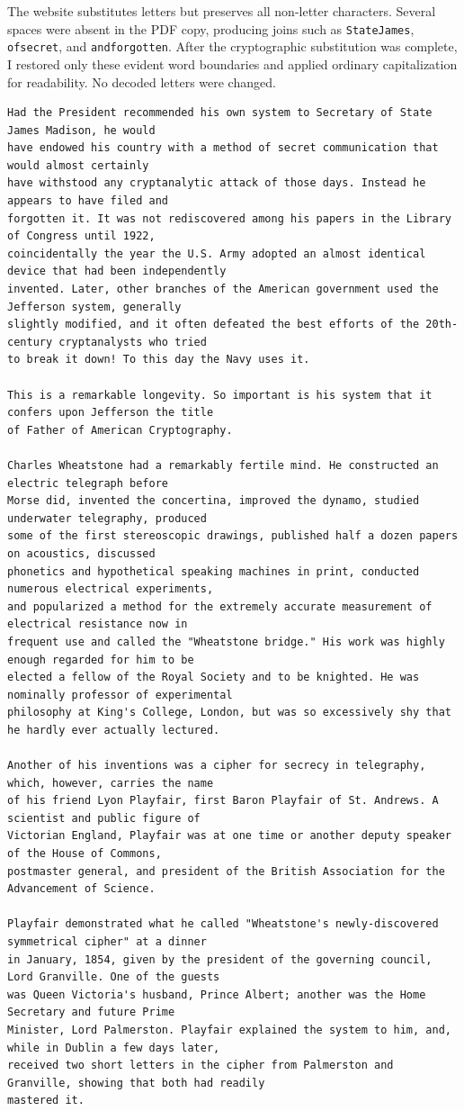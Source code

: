 \documentclass[12pt,a4paper]{article}
\begin{document}
The website substitutes letters but preserves all non-letter characters. Several spaces were absent in the PDF copy, producing joins such as \texttt{StateJames}, \texttt{ofsecret}, and \texttt{andforgotten}. After the cryptographic substitution was complete, I restored only these evident word boundaries and applied ordinary capitalization for readability. No decoded letters were changed.
\begin{lstlisting}[style=plaintext,caption={Recovered plaintext with restored word spacing}]
Had the President recommended his own system to Secretary of State James Madison, he would
have endowed his country with a method of secret communication that would almost certainly
have withstood any cryptanalytic attack of those days. Instead he appears to have filed and
forgotten it. It was not rediscovered among his papers in the Library of Congress until 1922,
coincidentally the year the U.S. Army adopted an almost identical device that had been independently
invented. Later, other branches of the American government used the Jefferson system, generally
slightly modified, and it often defeated the best efforts of the 20th-century cryptanalysts who tried
to break it down! To this day the Navy uses it.

This is a remarkable longevity. So important is his system that it confers upon Jefferson the title
of Father of American Cryptography.

Charles Wheatstone had a remarkably fertile mind. He constructed an electric telegraph before
Morse did, invented the concertina, improved the dynamo, studied underwater telegraphy, produced
some of the first stereoscopic drawings, published half a dozen papers on acoustics, discussed
phonetics and hypothetical speaking machines in print, conducted numerous electrical experiments,
and popularized a method for the extremely accurate measurement of electrical resistance now in
frequent use and called the "Wheatstone bridge." His work was highly enough regarded for him to be
elected a fellow of the Royal Society and to be knighted. He was nominally professor of experimental
philosophy at King's College, London, but was so excessively shy that he hardly ever actually lectured.

Another of his inventions was a cipher for secrecy in telegraphy, which, however, carries the name
of his friend Lyon Playfair, first Baron Playfair of St. Andrews. A scientist and public figure of
Victorian England, Playfair was at one time or another deputy speaker of the House of Commons,
postmaster general, and president of the British Association for the Advancement of Science.

Playfair demonstrated what he called "Wheatstone's newly-discovered symmetrical cipher" at a dinner
in January, 1854, given by the president of the governing council, Lord Granville. One of the guests
was Queen Victoria's husband, Prince Albert; another was the Home Secretary and future Prime
Minister, Lord Palmerston. Playfair explained the system to him, and, while in Dublin a few days later,
received two short letters in the cipher from Palmerston and Granville, showing that both had readily
mastered it.
\end{lstlisting}
\end{document}
